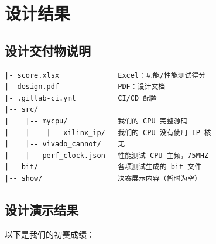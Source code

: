 \section{设计结果}

\subsection{设计交付物说明}

\begin{verbatim}
|- score.xlsx              Excel：功能/性能测试得分
|- design.pdf              PDF：设计文档
|- .gitlab-ci.yml          CI/CD 配置
|-- src/
|    |-- mycpu/            我们的 CPU 完整源码
|    |    |-- xilinx_ip/   我们的 CPU 没有使用 IP 核 
|    |-- vivado_cannot/    无
|    |-- perf_clock.json   性能测试 CPU 主频，75MHZ
|-- bit/                   各项测试生成的 bit 文件
|-- show/                  决赛展示内容（暂时为空）
\end{verbatim}

\subsection{设计演示结果}







以下是我们的初赛成绩：

